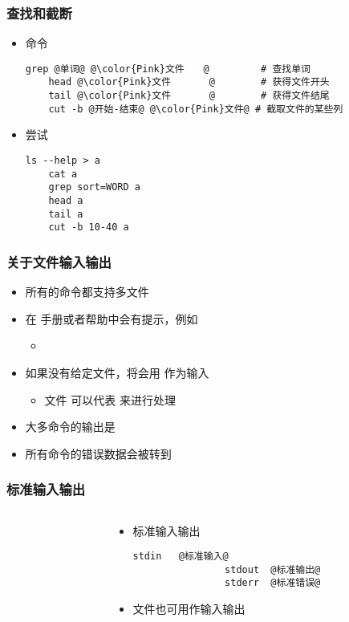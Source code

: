 \begin{frame} [fragile]
	\frametitle{查找和截断}
	\linespread{1.25}
	\begin{itemize}
	\item 命令
	\begin{lstlisting}[style=bashstyle, gobble=4, texcl, escapechar=@]
	grep @单词@ @\color{Pink}文件　　@		 # 查找单词
	head @\color{Pink}文件　　　　@		 # 获得文件开头
	tail @\color{Pink}文件　　　　@		 # 获得文件结尾
	cut -b @开始-结束@ @\color{Pink}文件@	# 截取文件的某些列
	\end{lstlisting}
	\item 尝试
	\begin{lstlisting}[style=bashstyle, gobble=4, texcl, escapechar=@]
	ls --help > a
	cat a
	grep sort=WORD a
	head a
	tail a
	cut -b 10-40 a
	\end{lstlisting}
	\end{itemize}
\end{frame}

\begin{frame} [fragile]
	\frametitle{关于文件输入输出}
	\linespread{1.5}
	\begin{itemize}
	\item 所有的命令都支持多文件
	\item 在  手册或者帮助中会有提示，例如
		\begin{itemize}
		\item {}
		\end{itemize}
	\item 如果没有给定文件，将会用  作为输入
		\begin{itemize}
		\item 文件 \inlineBash{-} 可以代表  来进行处理
		\end{itemize}
	\item 大多命令的输出是 
	\item 所有命令的错误数据会被转到 
	\end{itemize}
\end{frame}

\begin{frame} [fragile]
	\frametitle{标准输入输出}
	\linespread{1.25}
	\begin{columns}[T]
		\begin{column}[T]{.5\textwidth}
			
		\end{column}
		\begin{column}[T]{.5\textwidth}
			\begin{itemize}
			\item 标准输入输出
				\begin{lstlisting}[style=bashstyle, gobble=16, escapechar=@]
				stdin	@标准输入@
				stdout	@标准输出@
				stderr	@标准错误@
				\end{lstlisting}
			\item 文件也可用作输入输出
			\end{itemize}
		\end{column}
	\end{columns}
\end{frame}

